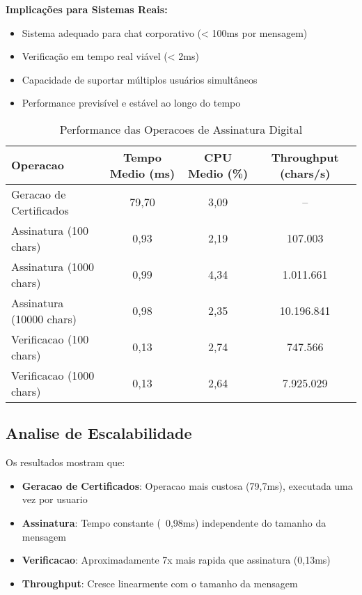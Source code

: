 \documentclass[12pt,a4paper,oneside]{article}
\begin{document}
\textbf{Implicações para Sistemas Reais:}
\begin{itemize}
    \item Sistema adequado para chat corporativo (< 100ms por mensagem)
    \item Verificação em tempo real viável (< 2ms)
    \item Capacidade de suportar múltiplos usuários simultâneos
    \item Performance previsível e estável ao longo do tempo
\end{itemize}

\begin{table}[H]
\centering
\caption{Performance das Operacoes de Assinatura Digital}
\label{tab:signature_performance}
\begin{tabular}{lccc}
\toprule
\textbf{Operacao} & \textbf{Tempo Medio (ms)} & \textbf{CPU Medio (\%)} & \textbf{Throughput (chars/s)} \\
\midrule
Geracao de Certificados & 79,70 & 3,09 & -- \\
Assinatura (100 chars) & 0,93 & 2,19 & 107.003 \\
Assinatura (1000 chars) & 0,99 & 4,34 & 1.011.661 \\
Assinatura (10000 chars) & 0,98 & 2,35 & 10.196.841 \\
Verificacao (100 chars) & 0,13 & 2,74 & 747.566 \\
Verificacao (1000 chars) & 0,13 & 2,64 & 7.925.029 \\
\bottomrule
\end{tabular}
\end{table}

\subsection{Analise de Escalabilidade}

Os resultados mostram que:

\begin{itemize}
    \item \textbf{Geracao de Certificados}: Operacao mais custosa (79,7ms), executada uma vez por usuario
    \item \textbf{Assinatura}: Tempo constante (~0,98ms) independente do tamanho da mensagem
    \item \textbf{Verificacao}: Aproximadamente 7x mais rapida que assinatura (0,13ms)
    \item \textbf{Throughput}: Cresce linearmente com o tamanho da mensagem
\end{itemize}
\end{document}
